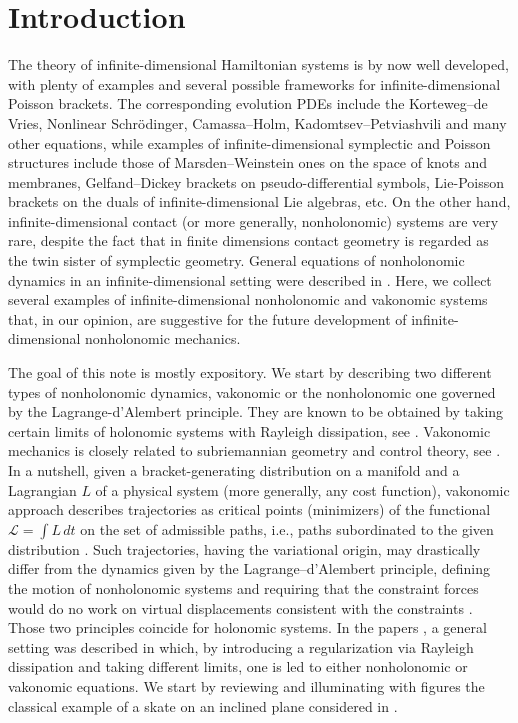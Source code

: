 \documentclass[11pt]{article}
\theoremstyle{definition}
\newcounter{ai}
\begin{document}

\section{Introduction}

The theory of infinite-dimensional Hamiltonian systems is by now  well developed, with plenty of examples and several possible frameworks for infinite-dimensional Poisson brackets. The corresponding evolution PDEs include the Korteweg--de Vries, Nonlinear Schr\"odinger, Camassa--Holm, Kadomtsev--Petviashvili and many other equations, while examples of infinite-dimensional symplectic and Poisson structures include those of Marsden--Weinstein ones on the space of knots and membranes, Gelfand--Dickey brackets on pseudo-differential symbols, Lie-Poisson brackets on the duals of infinite-dimensional Lie algebras, etc. 
On the other hand, infinite-dimensional contact (or more generally, nonholonomic) systems are very rare, despite the fact that in finite dimensions contact geometry is regarded as the twin sister of symplectic geometry. 
General equations of nonholonomic dynamics in an infinite-dimensional setting were described in  \cite{Shi2017, Shi2020}. 
Here, we collect several examples of infinite-dimensional nonholonomic and vakonomic systems that, in our opinion, are suggestive for the future development of infinite-dimensional nonholonomic mechanics.


The goal of this note is mostly expository. We start by describing two different types of nonholonomic dynamics, vakonomic 
or the nonholonomic one governed by the Lagrange-d'Alembert principle. They are known to be obtained by taking certain limits of holonomic systems with Rayleigh dissipation, see \cite{kozlov1983realization}. 
Vakonomic mechanics is closely related to subriemannian geometry and control theory, see \cite{montgomery2002tour}. In a nutshell, given a bracket-generating distribution on a manifold and a Lagrangian $L$ of a physical system  (more generally, any cost function), vakonomic approach describes trajectories as critical points (minimizers)
of the functional $\mathcal L=\int L \,dt$  on the set of admissible paths, i.e., paths subordinated to the given distribution  \cite{kozlov1992problem}. Such trajectories, having the variational origin, may drastically differ from the dynamics given by the Lagrange--d'Alembert principle, defining the motion of nonholonomic systems and requiring that the constraint forces would do no work on virtual displacements consistent with the
constraints \cite{bloch2003nonholonomic}.   Those two principles coincide for holonomic systems. 
In the papers \cite{kozlov1983realization, kozlov1992problem}, a general setting was described in which, by introducing a regularization via Rayleigh dissipation and taking different limits, one is led to either nonholonomic or vakonomic equations. We start by
reviewing and illuminating with figures  the classical example of a skate on an inclined plane considered in \cite{kozlov1983realization}.
\end{document}
